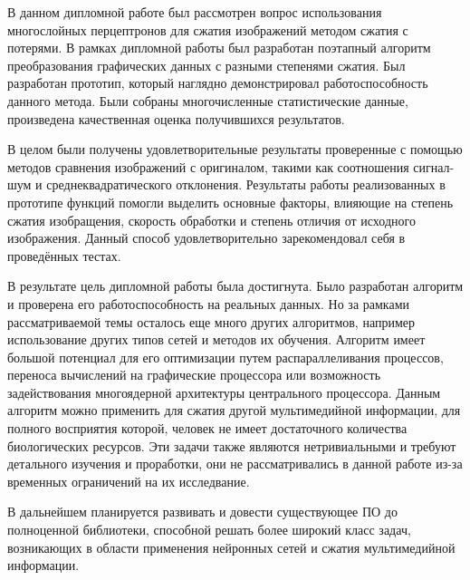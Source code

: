 
В данном дипломной работе был рассмотрен вопрос использования многослойных перцептронов для сжатия изображений методом сжатия с потерями.
В рамках дипломной работы был разработан поэтапный алгоритм преобразования графических данных с разными степенями сжатия.
Был разработан прототип, который наглядно демонстрировал работоспособность данного метода.
Были собраны многочисленные статистические данные, произведена качественная оценка получившихся результатов.

В целом были получены удовлетворительные результаты проверенные с помощью методов сравнения изображений с оригиналом,
такими как соотношения сигнал-шум и среднеквадратического отклонения.
Результаты работы реализованных в прототипе функций помогли выделить основные факторы, влияющие на степень сжатия изобращения,
скорость обработки и степень отличия от исходного изображения.
Данный способ удовлетворительно зарекомендовал себя в проведённых тестах.

В результате цель дипломной работы была достигнута.
Было разработан алгоритм и проверена его работоспособность на реальных данных.
Но за рамками рассматриваемой темы осталось еще много других алгоритмов, например использование других типов сетей и методов их обучения.
Алгоритм имеет большой потенциал для его оптимизации путем распараллеливания процессов,
переноса вычислений на графические процессора или возможность задействования многоядерной архитектуры центрального процессора.
Данным алгоритм можно применить для сжатия другой мультимедийной информации, для полного восприятия которой,
человек не имеет достаточного количества биологических ресурсов.
Эти задачи также являются нетривиальными и требуют детального изучения и проработки,
они не рассматривались в данной работе из-за временных ограничений на их исследвание.

В дальнейшем планируется развивать и довести существующее ПО до полноценной библиотеки,
способной решать более широкий класс задач, возникающих в области применения нейронных
сетей и сжатия мультимедийной информации.
